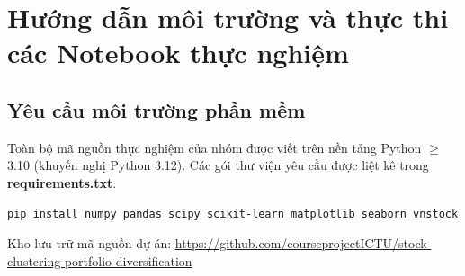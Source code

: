\documentclass[12pt,a4paper,oneside,openany]{report}
\newcommand{\bmchapname}{Chương}
\renewcommand{\appendixname}{Phụ lục}%
\newcommand{\tocchapname}{Chương}
\begin{document}
\appendix
\renewcommand{\bmchapname}{Phụ lục}
\addtocontents{toc}{\protect\renewcommand{\protect\tocchapname}{\appendixname}}

\chapter{Hướng dẫn môi trường và thực thi các Notebook thực nghiệm}
\label{pl:huongdan}

\section{Yêu cầu môi trường phần mềm}
Toàn bộ mã nguồn thực nghiệm của nhóm được viết trên nền tảng Python $\geq$ 3.10 (khuyến nghị Python 3.12). Các gói thư viện yêu cầu được liệt kê trong \textbf{requirements.txt}:
\begin{lstlisting}[language=bash,numbers=none]
pip install numpy pandas scipy scikit-learn matplotlib seaborn vnstock
\end{lstlisting}

Kho lưu trữ mã nguồn dự án:
\url{https://github.com/courseprojectICTU/stock-clustering-portfolio-diversification}
\end{document}
